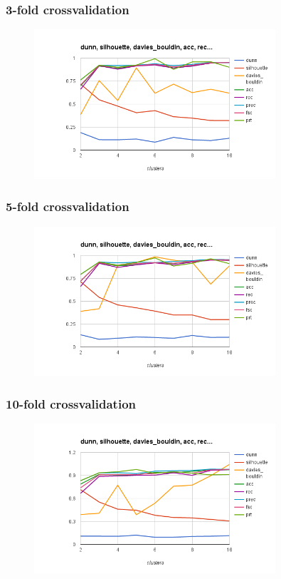 \documentclass{article}
\begin{document}
\subsubsection{3-fold crossvalidation}
\begin{figure}[p]
    \centering
    \includegraphics[width=0.8\textwidth]{pam_iris.arff_3}
\end{figure}
\subsubsection{5-fold crossvalidation}
\begin{figure}[p]
    \centering
    \includegraphics[width=0.8\textwidth]{pam_iris.arff_5}
\end{figure}
\subsubsection{10-fold crossvalidation}
\begin{figure}[p]
    \centering
    \includegraphics[width=0.8\textwidth]{pam_iris.arff_10}
\end{figure}
\end{document}
